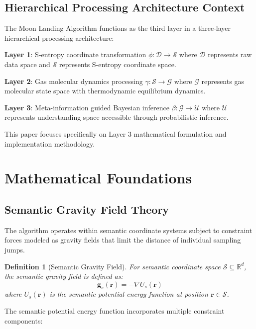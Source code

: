 \documentclass[12pt,a4paper]{article}
\newtheorem{definition}{Definition}
\begin{document}
\subsection{Hierarchical Processing Architecture Context}

The Moon Landing Algorithm functions as the third layer in a three-layer hierarchical processing architecture:

\textbf{Layer 1}: S-entropy coordinate transformation $\phi: \mathcal{D} \to \mathcal{S}$ where $\mathcal{D}$ represents raw data space and $\mathcal{S}$ represents S-entropy coordinate space.

\textbf{Layer 2}: Gas molecular dynamics processing $\gamma: \mathcal{S} \to \mathcal{G}$ where $\mathcal{G}$ represents gas molecular state space with thermodynamic equilibrium dynamics.

\textbf{Layer 3}: Meta-information guided Bayesian inference $\beta: \mathcal{G} \to \mathcal{U}$ where $\mathcal{U}$ represents understanding space accessible through probabilistic inference.

This paper focuses specifically on Layer 3 mathematical formulation and implementation methodology.

\section{Mathematical Foundations}

\subsection{Semantic Gravity Field Theory}

The algorithm operates within semantic coordinate systems subject to constraint forces modeled as gravity fields that limit the distance of individual sampling jumps.

\begin{definition}[Semantic Gravity Field]
For semantic coordinate space $\mathcal{S} \subseteq \mathbb{R}^d$, the semantic gravity field is defined as:
\begin{equation}
\mathbf{g}_s(\mathbf{r}) = -\nabla U_s(\mathbf{r})
\end{equation}
where $U_s(\mathbf{r})$ is the semantic potential energy function at position $\mathbf{r} \in \mathcal{S}$.
\end{definition}

The semantic potential energy function incorporates multiple constraint components:
\end{document}
